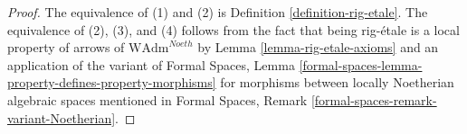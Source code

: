 \documentclass[10pt,a4paper]{amsart}
\theoremstyle{plain}
\theoremstyle{definition}
\theoremstyle{remark}
\numberwithin{equation}{subsection}
\begin{document}
\begin{proof}
The equivalence of (1) and (2) is Definition \ref{definition-rig-etale}.
The equivalence of (2), (3), and (4) follows from the fact that
being rig-\'etale is a local property of arrows of
$\text{WAdm}^{Noeth}$ by Lemma \ref{lemma-rig-etale-axioms}
and an application of the variant of
Formal Spaces, Lemma
\ref{formal-spaces-lemma-property-defines-property-morphisms}
for morphisms between locally Noetherian algebraic spaces
mentioned in Formal Spaces, Remark
\ref{formal-spaces-remark-variant-Noetherian}.
\end{proof}
\end{document}
